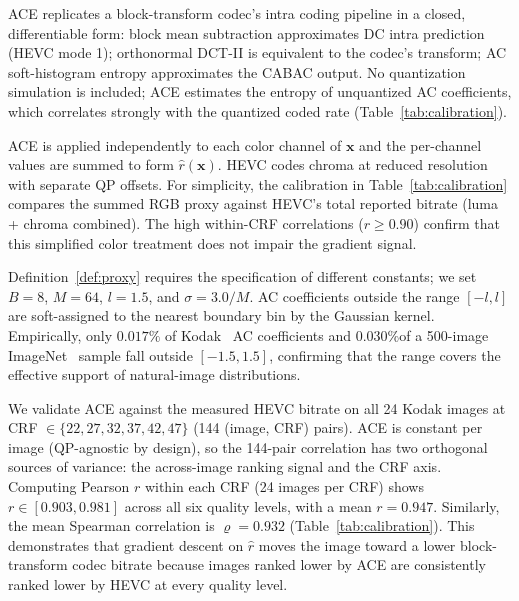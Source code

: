 \documentclass{article}
\theoremstyle{definition}
\newcommand{\bx}{\boldsymbol{x}}
\begin{document}
ACE replicates a block-transform codec's intra coding pipeline in a closed, differentiable form: block mean subtraction approximates DC intra prediction (HEVC mode 1); orthonormal DCT-II is equivalent to the codec's transform; AC soft-histogram entropy approximates the CABAC output.
No quantization simulation is included; ACE estimates the entropy of unquantized AC coefficients, which correlates strongly with the quantized coded rate (Table~\ref{tab:calibration}).

ACE is applied independently to each color channel of $\bx$ and the per-channel values are summed to form $\hat{r}(\bx)$.
HEVC codes chroma at reduced resolution with separate QP offsets.
For simplicity, the calibration in Table~\ref{tab:calibration} compares the summed RGB proxy against HEVC's total reported bitrate (luma + chroma combined).
The high within-CRF correlations ($r\ge0.90$) confirm that this simplified color treatment does not impair the gradient signal.

Definition~\ref{def:proxy} requires the specification of different constants; we set $B=8$, $M=64$, $l=1.5$, and $\sigma=3.0/M$.
AC coefficients outside the range $[-l,l]$ are soft-assigned to the nearest boundary bin by the Gaussian kernel.
Empirically, only $0.017\%$ of Kodak~\citep{kodak1993} AC coefficients and $0.030\%$of a 500-image ImageNet~\citep{deng2009imagenet} sample fall outside $[-1.5, 1.5]$, confirming that the range covers the effective support of natural-image distributions.

We validate ACE against the measured HEVC bitrate on all 24 Kodak images at CRF $\in\{22,27,32,37,42,47\}$ (144 (image, CRF) pairs).
ACE is constant per image (QP-agnostic by design), so the 144-pair correlation has two orthogonal sources of variance: the across-image ranking signal and the CRF axis.
Computing Pearson $r$ within each CRF (24 images per CRF) shows $r \in [0.903, 0.981]$ across all six quality levels, with a mean $r = 0.947$.
Similarly, the mean Spearman correlation is $\varrho = 0.932$ (Table~\ref{tab:calibration}).
This demonstrates that gradient descent on $\hat{r}$ moves the image toward a lower block-transform codec bitrate because images ranked lower by ACE are consistently ranked lower by HEVC at every quality level.
\end{document}
